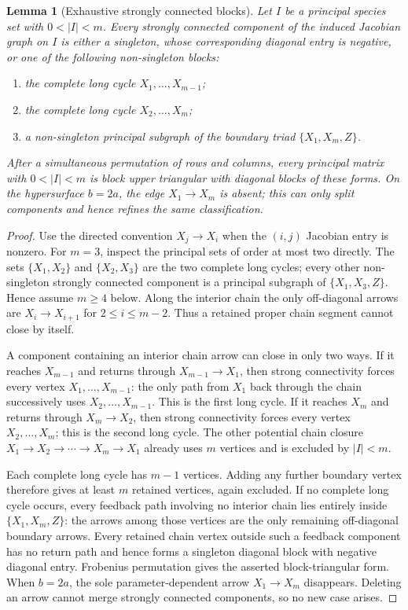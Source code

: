 \documentclass[11pt]{article}
\newtheorem{lemma}[theorem]{Lemma}
\theoremstyle{definition}
\newcommand{\1}{\mathbf 1}
\begin{document}
\begin{lemma}[Exhaustive strongly connected blocks]\label{lem:scc}
Let $I$ be a principal species set with $0<|I|<m$.  Every strongly connected
component of the induced Jacobian graph on $I$ is either a singleton, whose
corresponding diagonal entry is negative, or one of the following
non-singleton blocks:
\begin{enumerate}[leftmargin=2em]
\item the complete long cycle $X_1,\ldots,X_{m-1}$;
\item the complete long cycle $X_2,\ldots,X_m$;
\item a non-singleton principal subgraph of the boundary triad
$\{X_1,X_m,Z\}$.
\end{enumerate}
After a simultaneous permutation of rows and columns, every principal matrix
with $0<|I|<m$ is block upper triangular with diagonal blocks of these forms.
On the hypersurface $b=2a$, the edge $X_1\to X_m$ is absent; this can only
split components and hence refines the same classification.
\end{lemma}

\begin{proof}
Use the directed convention $X_j\to X_i$ when the $(i,j)$ Jacobian entry is
nonzero.  For $m=3$, inspect the principal sets of order at most two directly.
The sets $\{X_1,X_2\}$ and $\{X_2,X_3\}$ are the two complete long cycles;
every other non-singleton strongly connected component is a principal subgraph
of $\{X_1,X_3,Z\}$.  Hence assume $m\ge4$ below.  Along the interior chain the
only off-diagonal arrows are
$X_i\to X_{i+1}$ for $2\le i\le m-2$.  Thus a retained proper chain segment
cannot close by itself.

A component containing an interior chain arrow can close in only two ways.
If it reaches $X_{m-1}$ and returns through $X_{m-1}\to X_1$, then strong
connectivity forces every vertex $X_1,\ldots,X_{m-1}$: the only path from
$X_1$ back through the chain successively uses $X_2,\ldots,X_{m-1}$.  This is
the first long cycle.  If it reaches $X_m$ and returns through
$X_m\to X_2$, then strong connectivity forces every vertex
$X_2,\ldots,X_m$; this is the second long cycle.  The other potential chain
closure $X_1\to X_2\to\cdots\to X_m\to X_1$ already uses $m$ vertices and is
excluded by $|I|<m$.

Each complete long cycle has $m-1$ vertices.  Adding any further boundary
vertex therefore gives at least $m$ retained vertices, again excluded.  If no
complete long cycle occurs, every feedback path involving no interior chain
lies entirely inside $\{X_1,X_m,Z\}$: the arrows among those vertices are the
only remaining off-diagonal boundary arrows.  Every retained chain vertex
outside such a feedback component has no return path and hence forms a
singleton diagonal block with negative diagonal entry.  Frobenius
permutation gives the asserted block-triangular form.  When $b=2a$, the sole
parameter-dependent arrow $X_1\to X_m$ disappears.  Deleting an arrow cannot
merge strongly connected components, so no new case arises.
\end{proof}
\end{document}
